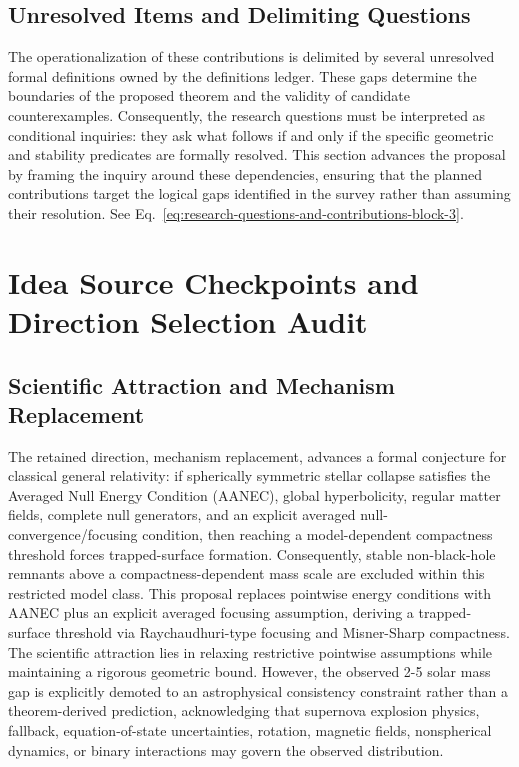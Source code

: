 \documentclass[conference]{IEEEtran}
\begin{document}
\subsection{Unresolved Items and Delimiting Questions}
The operationalization of these contributions is delimited by several unresolved formal definitions owned by the definitions ledger. These gaps determine the boundaries of the proposed theorem and the validity of candidate counterexamples. Consequently, the research questions must be interpreted as conditional inquiries: they ask what follows if and only if the specific geometric and stability predicates are formally resolved. This section advances the proposal by framing the inquiry around these dependencies, ensuring that the planned contributions target the logical gaps identified in the survey rather than assuming their resolution. See Eq.~\eqref{eq:research-questions-and-contributions-block-3}.

\section{Idea Source Checkpoints and Direction Selection Audit}
\subsection{Scientific Attraction and Mechanism Replacement}
The retained direction, mechanism replacement, advances a formal conjecture for classical general relativity: if spherically symmetric stellar collapse satisfies the Averaged Null Energy Condition (AANEC), global hyperbolicity, regular matter fields, complete null generators, and an explicit averaged null-convergence/focusing condition, then reaching a model-dependent compactness threshold forces trapped-surface formation. Consequently, stable non-black-hole remnants above a compactness-dependent mass scale are excluded within this restricted model class. This proposal replaces pointwise energy conditions with AANEC plus an explicit averaged focusing assumption, deriving a trapped-surface threshold via Raychaudhuri-type focusing and Misner-Sharp compactness. The scientific attraction lies in relaxing restrictive pointwise assumptions while maintaining a rigorous geometric bound. However, the observed 2-5 solar mass gap is explicitly demoted to an astrophysical consistency constraint rather than a theorem-derived prediction, acknowledging that supernova explosion physics, fallback, equation-of-state uncertainties, rotation, magnetic fields, nonspherical dynamics, or binary interactions may govern the observed distribution.~\cite{cite_0ed84243cf171bc4}
\end{document}
